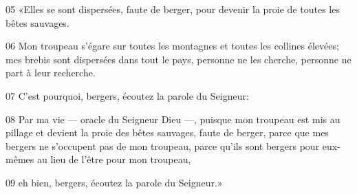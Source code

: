 
05 «Elles se sont dispersées, faute de berger, pour devenir la proie de toutes les bêtes sauvages.

06 Mon troupeau s’égare sur toutes les montagnes et toutes les collines élevées; mes brebis sont dispersées dans tout le pays, personne ne les cherche, personne ne part à leur recherche.

07 C’est pourquoi, bergers, écoutez la parole du Seigneur:

08 Par ma vie --- oracle du Seigneur Dieu ---, puisque mon troupeau est mis au pillage et devient la proie des bêtes sauvages, faute de berger, parce que mes bergers ne s’occupent pas de mon troupeau, parce qu’ils sont bergers pour eux-mêmes au lieu de l’être pour mon troupeau,

09 eh bien, bergers, écoutez la parole du Seigneur.»
